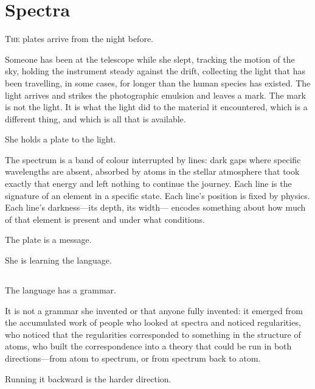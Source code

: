 
\chapter{Spectra}


\lettrine{T}{he} plates arrive from the night before.

Someone has been at the telescope while she slept,
tracking the motion of the sky, holding the instrument
steady against the drift, collecting the light that
has been travelling, in some cases, for longer than
the human species has existed. The light arrives and
strikes the photographic emulsion and leaves a mark.
The mark is not the light. It is what the light did
to the material it encountered, which is a different
thing, and which is all that is available.

She holds a plate to the light.

The spectrum is a band of colour interrupted by lines:
dark gaps where specific wavelengths are absent,
absorbed by atoms in the stellar atmosphere that took
exactly that energy and left nothing to continue the
journey. Each line is the signature of an element in
a specific state. Each line's position is fixed by
physics. Each line's darkness---its depth, its width---
encodes something about how much of that element is
present and under what conditions.

The plate is a message.

She is learning the language.

\section{}

The language has a grammar.

It is not a grammar she invented or that anyone fully
invented: it emerged from the accumulated work of
people who looked at spectra and noticed regularities,
who noticed that the regularities corresponded to
something in the structure of atoms, who built the
correspondence into a theory that could be run in
both directions---from atom to spectrum, or from
spectrum back to atom.

Running it backward is the harder direction.

